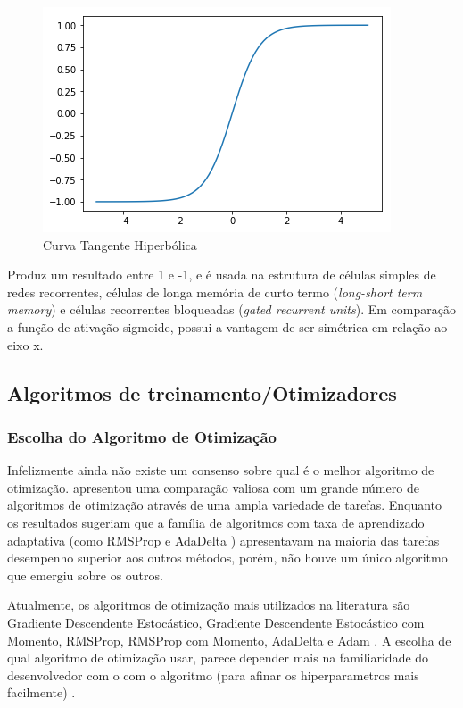 \documentclass[12pt]{article}
\begin{document}
\begin{figure}[!htb]
\centering
\includegraphics[width=.5\textwidth]{images/tanh.png}
\caption{Curva Tangente Hiperbólica}
\label{fig:tanh}
\end{figure}

Produz um resultado entre 1 e -1, e é usada na estrutura de células simples de redes recorrentes, células de longa memória de curto termo (\textit{long-short term memory}) e células recorrentes bloqueadas (\textit{gated recurrent units}). Em comparação a função de ativação sigmoide, possui a vantagem de ser simétrica em relação ao eixo x.

\subsection{Algoritmos de treinamento/Otimizadores}

\subsubsection{Escolha do Algoritmo de Otimização}

Infelizmente ainda não existe um consenso sobre qual é o melhor algoritmo de otimização. \cite{DBLP:journals/corr/SchaulAS13} apresentou uma comparação valiosa com um grande número de algoritmos de otimização através de uma ampla variedade de tarefas. Enquanto os resultados sugeriam que a família de algoritmos com taxa de aprendizado adaptativa (como RMSProp e AdaDelta \cite{DBLP:journals/corr/abs-1212-5701}) apresentavam na maioria das tarefas desempenho superior aos outros métodos, porém, não houve um único algoritmo que emergiu sobre os outros.

Atualmente, os algoritmos de otimização mais utilizados na literatura são Gradiente Descendente Estocástico, Gradiente Descendente Estocástico com Momento, RMSProp, RMSProp com Momento, AdaDelta \cite{DBLP:journals/corr/Ruder16} e Adam \cite{DBLP:journals/corr/KingmaB14}. A escolha de qual algoritmo de otimização usar, parece depender mais na familiaridade do desenvolvedor com o com o algoritmo (para afinar os hiperparametros mais facilmente) \cite{Goodfellow-et-al-2016}.
\end{document}
